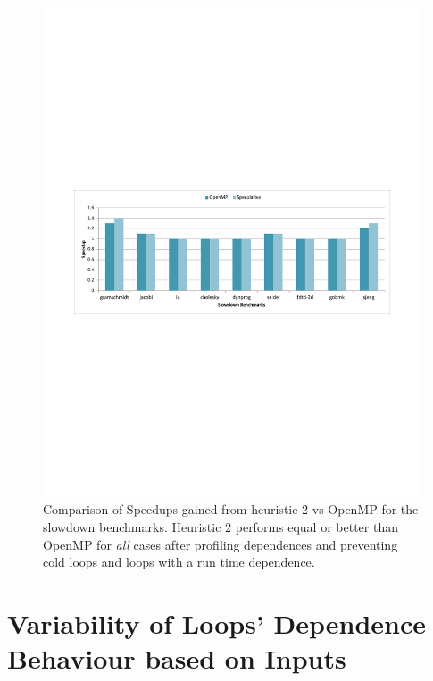 \documentclass[10pt]{report}          %
\begin{document}
\begin{figure}
\centering
\includegraphics[scale=0.75]{./pdf/heu2.pdf}
\caption{Comparison of Speedups gained from heuristic 2 vs OpenMP for the slowdown benchmarks. Heuristic 2 performs equal or better than OpenMP for \textit{all} cases after profiling dependences and preventing cold loops and loops with a run time dependence. }
\label{fig:heu2}
\end{figure}

\section{Variability of Loops' Dependence Behaviour based on Inputs}
\end{document}
